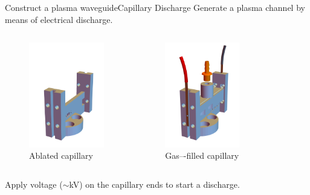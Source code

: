\documentclass[dvipsnames]{beamer}
\begin{document}
\begin{frame}{Construct a plasma waveguide}{Capillary Discharge}
Generate a plasma channel by means of electrical discharge.
\begin{columns}
\begin{figure}
    \centering
    \includegraphics[height=130pt]{figures/theory/ablated.png}
    \caption{Ablated capillary}
\end{figure}
\begin{figure}
\centering
\includegraphics[height=130pt]{figures/theory/gasfilled_with_barb.png}
\caption{Gas–-filled capillary}
\end{figure}
\end{columns}
Apply voltage ($\sim$\si{\kV}) on the capillary ends to start a discharge.
\end{frame}
\end{document}
